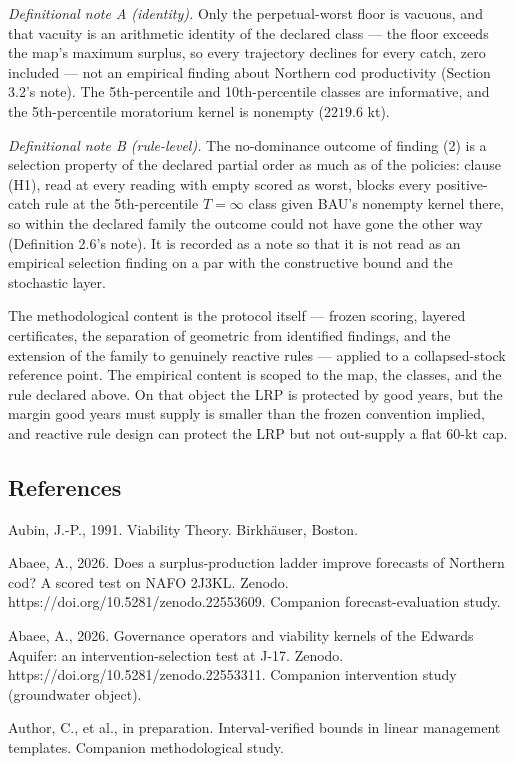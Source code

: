 \documentclass[11pt]{article}
\begin{document}
\emph{Definitional note A (identity).} Only the perpetual-worst floor is
vacuous, and that vacuity is an arithmetic identity of the declared
class --- the floor exceeds the map's maximum surplus, so every
trajectory declines for every catch, zero included --- not an empirical
finding about Northern cod productivity (Section 3.2's note). The
5th-percentile and 10th-percentile classes are informative, and the
5th-percentile moratorium kernel is nonempty (\(2219.6\) kt).

\emph{Definitional note B (rule-level).} The no-dominance outcome of
finding (2) is a selection property of the declared partial order as
much as of the policies: clause (H1), read at every reading with empty
scored as worst, blocks every positive-catch rule at the 5th-percentile
\(T=\infty\) class given BAU's nonempty kernel there, so within the
declared family the outcome could not have gone the other way
(Definition 2.6's note). It is recorded as a note so that it is not read
as an empirical selection finding on a par with the constructive bound
and the stochastic layer.

The methodological content is the protocol itself --- frozen scoring,
layered certificates, the separation of geometric from identified
findings, and the extension of the family to genuinely reactive rules
--- applied to a collapsed-stock reference point. The empirical content
is scoped to the map, the classes, and the rule declared above. On that
object the LRP is protected by good years, but the margin good years
must supply is smaller than the frozen convention implied, and reactive
rule design can protect the LRP but not out-supply a flat 60-kt cap.

\subsection{References}\label{references}

Aubin, J.-P., 1991. Viability Theory. Birkh\"auser, Boston.

Abaee, A., 2026. Does a surplus-production ladder improve forecasts of
Northern cod? A scored test on NAFO 2J3KL. Zenodo.
https://doi.org/10.5281/zenodo.22553609. Companion forecast-evaluation
study.

Abaee, A., 2026. Governance operators and viability kernels of the
Edwards Aquifer: an intervention-selection test at J-17. Zenodo.
https://doi.org/10.5281/zenodo.22553311. Companion intervention study
(groundwater object).

Author, C., et al., in preparation. Interval-verified bounds in linear
management templates. Companion methodological study.
\end{document}
